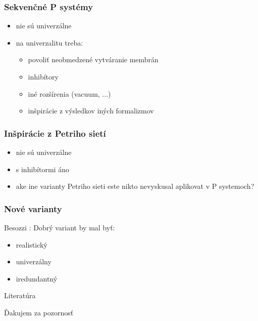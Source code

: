 \documentclass{beamer}
\begin{document}
\begin{frame}[t]\frametitle{Sekvenčné P systémy}
\begin{itemize}
  \item nie sú univerzálne
  \item na univerzalitu treba:
  \begin{itemize}
    \item povoliť neobmedzené vytváranie membrán \cite{Dang:2005:Sequential}
    \item inhibítory
    \item iné rozšírenia (vacuum, ...)
    \item inšpirácie z výsledkov iných formalizmov
  \end{itemize}
\end{itemize}
\end{frame}

\begin{frame}[t]\frametitle{Inšpirácie z Petriho sietí}
\begin{itemize}
  \item nie sú univerzálne
  \item s inhibítormi áno
  \item ake ine varianty Petriho sieti este nikto nevyskusal aplikovat v P systemoch?
\end{itemize}
\end{frame}

\begin{frame}[t]\frametitle{Nové varianty}
Besozzi \cite{Besozzi:PhD:2004}: Dobrý variant by mal byť:
\begin{itemize}
  \item realistický
  \item univerzálny
  \item iredundantný
\end{itemize}
\end{frame}


\begin{frame}[allowframebreaks]{Literatúra}


\end{frame}

\begin{frame}[plain]
\begin{center}
  Ďakujem za pozornosť
\end{center}
\end{frame}
\end{document}
